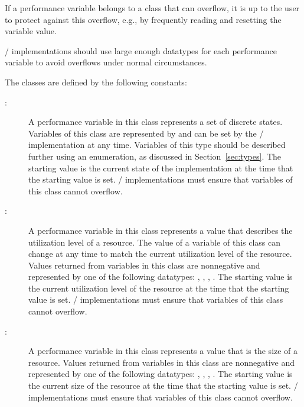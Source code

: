 \begin{users}
If a performance variable belongs to a class that can overflow, it is up to
the user to protect against this overflow, e.g., by frequently reading and
resetting the variable value.
\end{users}

\begin{implementors}
\MPI/ implementations should use large enough datatypes for each
performance variable to avoid overflows under normal circumstances.
\end{implementors}

The classes are defined by the following constants:

\begin{sloppy}

\begin{description}

\item[:]A performance variable in this
  class represents a set of discrete states.  Variables of this class are
  represented by  and can be set by the \MPI/
  implementation at any time.  Variables of this type should be described
  further using an enumeration, as discussed in Section~\ref{sec:types}.
  The starting value is the current state of the implementation at the time
  that the starting value is set.  \MPI/ implementations must ensure that
  variables of this class cannot overflow.

\item[:]A performance variable in this
  class represents a value that describes the utilization level of a
  resource.  The value of a variable of this class can change at any time
  to match the current utilization level of the resource.  Values returned
  from variables in this class are nonnegative and represented by one of
  the following datatypes: ,
  , ,
  .  The starting value is the current utilization level
  of the resource at the time that the starting value is set.  \MPI/
  implementations must ensure that variables of this class cannot overflow.

\item[:]A performance variable in this
  class represents a value that is the size of a resource.  Values returned
  from variables in this class are nonnegative and represented by one of
  the following datatypes: ,
  , ,
  .  The starting value is the current size of the
  resource at the time that the starting value is set.  \MPI/
  implementations must ensure that variables of this class cannot overflow.


\end{description}
\end{sloppy}
